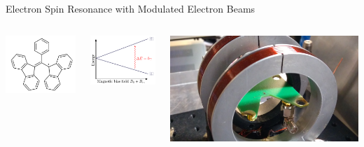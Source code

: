 \documentclass[final]{beamer}
\begin{document}
\begin{frame}[fragile]{}
\begin{columns}[T]
\begin{column}{.49\linewidth}
\begin{block}{\Large Electron Spin Resonance with Modulated Electron Beams}
        \begin{columns}
          \begin{column}{0.3\columnwidth}
            \includegraphics[width=0.67\columnwidth]{figures/bdpa.png}
          \end{column}
          \begin{column}{0.3\columnwidth}
            \includegraphics[width=\columnwidth]{figures/zeeman.pdf}
          \end{column}
          \begin{column}{0.4\columnwidth}
            \includegraphics[width=\columnwidth]{figures/esrsetuppcb.jpg}
          \end{column}
        \end{columns}


\end{block}
\end{column}
\end{columns}
\end{frame}
\end{document}
